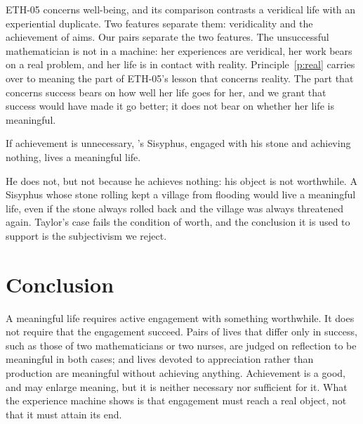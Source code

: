 \documentclass{situationist-preprint}
\begin{document}
\begin{reply}
ETH-05 concerns well-being, and its comparison contrasts a veridical life with an experiential duplicate. Two features separate them: veridicality and the achievement of aims. Our pairs separate the two features. The unsuccessful mathematician is not in a machine: her experiences are veridical, her work bears on a real problem, and her life is in contact with reality. Principle~\ref{p:real} carries over to meaning the part of ETH-05's lesson that concerns reality. The part that concerns success bears on how well her life goes for her, and we grant that success would have made it go better; it does not bear on whether her life is meaningful.
\end{reply}

\begin{objection}[Sisyphus]\label{o:sisyphus}
If achievement is unnecessary, \citeauthor{Taylor1970}'s Sisyphus, engaged with his stone and achieving nothing, lives a meaningful life.
\end{objection}

\begin{reply}
He does not, but not because he achieves nothing: his object is not worthwhile. A Sisyphus whose stone rolling kept a village from flooding would live a meaningful life, even if the stone always rolled back and the village was always threatened again. Taylor's case fails the condition of worth, and the conclusion it is used to support is the subjectivism we reject.
\end{reply}

\section{Conclusion}

A meaningful life requires active engagement with something worthwhile. It does not require that the engagement succeed. Pairs of lives that differ only in success, such as those of two mathematicians or two nurses, are judged on reflection to be meaningful in both cases; and lives devoted to appreciation rather than production are meaningful without achieving anything. Achievement is a good, and may enlarge meaning, but it is neither necessary nor sufficient for it. What the experience machine shows is that engagement must reach a real object, not that it must attain its end.
\end{document}
